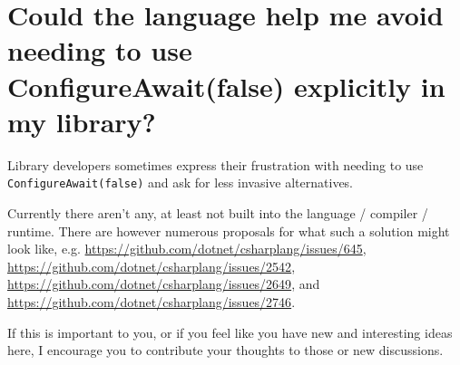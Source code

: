 \documentclass[a4paper,12pt,notitlepage,twoside,openright]{article}
\begin{document}
\hypertarget{could-the-language-help-me-avoid-needing-to-use-configureawaitfalse-explicitly-in-my-library}{%
\section{Could the language help me avoid needing to use
ConfigureAwait(false) explicitly in my
library?}\label{could-the-language-help-me-avoid-needing-to-use-configureawaitfalse-explicitly-in-my-library}}

Library developers sometimes express their frustration with needing to
use \texttt{ConfigureAwait(false)} and ask for less invasive
alternatives.

Currently there aren't any, at least not built into the language /
compiler / runtime. There are however numerous proposals for what such a
solution might look like, e.g.
\url{https://github.com/dotnet/csharplang/issues/645},
\url{https://github.com/dotnet/csharplang/issues/2542},
\url{https://github.com/dotnet/csharplang/issues/2649}, and
\url{https://github.com/dotnet/csharplang/issues/2746}.

If this is important to you, or if you feel like you have new and
interesting ideas here, I encourage you to contribute your thoughts to
those or new discussions.
\end{document}
